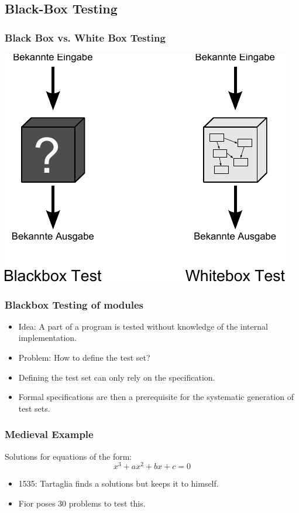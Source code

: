 \subsection{Black-Box Testing}


\begin{frame}
\frametitle{Black Box vs. White Box Testing}
  \begin{center}
  \includegraphics[width=.8\textwidth]{images/Qualitaetssicherung/abbildungen/BlackBoxAndWhiteBoxTesting}
  \end{center}
\end{frame}


\begin{frame}
\frametitle{Blackbox Testing of modules}
\begin{itemize}
  \item Idea: A part of a program is tested without knowledge of the internal implementation.
  \item Problem: How to define the test set? 
  \item Defining the test set can only rely on the specification.
  \item Formal specifications are then a prerequisite for the systematic generation of test sets.
\end{itemize}
\end{frame}


\begin{frame}
\frametitle{Medieval Example}
Solutions for equations of the form:
\begin{equation*}
  x^3 + ax^2 + bx + c = 0
\end{equation*}
 
\begin{itemize}
  \item 1535: Tartaglia finds a solutions but keeps it to himself.
  \item Fior poses 30 problems to test this.
\end{itemize}
\end{frame}

